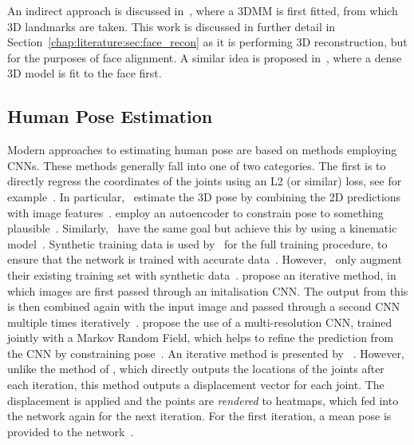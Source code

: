 An indirect approach is discussed in~\cite{zhu2016face}, where a 3DMM
is first fitted, from which 3D landmarks are taken. This work is
discussed in further detail in
Section~\ref{chap:literature:sec:face_recon} as it is performing 3D
reconstruction, but for the purposes of face alignment. A similar idea
is proposed in~\cite{jourabloo2016large}, where a dense 3D model is
fit to the face first.

\subsection{Human Pose Estimation}


Modern approaches to estimating human pose are based on methods
employing CNNs. These methods generally fall into one of two
categories. The first is to directly regress the coordinates of the
joints using an L2 (or similar) loss, see for
example~\cite{li20143d,park20163d,tekin2016structured,tekin2016direct,zhou2016deep,chen2016synthesizing,ghezelghieh2016learning,toshev2014deeppose,tompson2014joint}. In
particular,~\citeauthor{park20163d} estimate the 3D pose by combining
the 2D predictions with image
features~\cite{park20163d}. \citeauthor{tekin2016structured} employ an
autoencoder to constrain pose to something
plausible~\cite{tekin2016structured}. Similarly,~\citeauthor{zhou2016deep}
have the same goal but achieve this by using a kinematic
model~\cite{zhou2016deep}. Synthetic training data is used
by~\citeauthor{chen2016synthesizing} for the full training procedure,
to ensure that the network is trained with accurate
data~\cite{chen2016synthesizing}. However,~\citeauthor{ghezelghieh2016learning}
only augment their existing training set with synthetic
data~\cite{ghezelghieh2016learning}. \citeauthor{toshev2014deeppose}
propose an iterative method, in which images are first passed through
an initalisation CNN. The output from this is then combined again with
the input image and passed through a second CNN multiple times
iteratively~\cite{toshev2014deeppose}.  \citeauthor{tompson2014joint}
propose the use of a multi-resolution CNN, trained jointly with a
Markov Random Field, which helps to refine the prediction from the CNN
by constraining pose~\cite{tompson2014joint}. An iterative method is
presented by
\citeauthor{carreira2016human}~\cite{carreira2016human}. However,
unlike the method of \citeauthor{toshev2014deeppose}, which directly
outputs the locations of the joints after each iteration, this method
outputs a displacement vector for each joint. The displacement is
applied and the points are \textit{rendered} to heatmaps, which fed
into the network again for the next iteration. For the first
iteration, a mean pose is provided to the
network~\cite{carreira2016human}.


